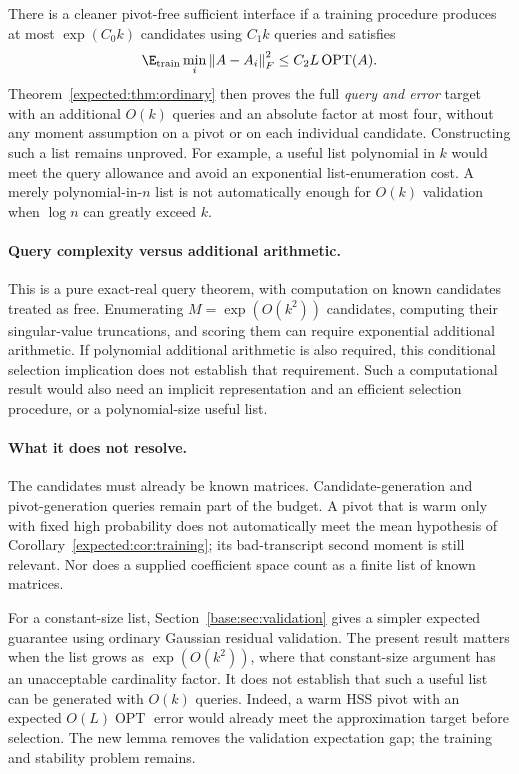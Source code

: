 \documentclass[11pt,oneside,openany,a4paper]{book}
\numberwithin{equation}{chapter}
\theoremstyle{definition}
\theoremstyle{remark}
\newcommand{\F}[1]{\left\lVert#1\right\rVert_F}
\begin{document}
There is a cleaner pivot-free sufficient interface if a training
procedure produces at most $\exp(C_0 k)$ candidates using $C_1k$
queries and satisfies
\[
 \E_{\rm train}\min_i\F{A-A_i}^2
       \le C_2L\operatorname{OPT}(A).
\]
Theorem~\ref{expected:thm:ordinary} then proves the full \emph{query and error}
target with an additional $O(k)$ queries and an absolute factor at
most four, without any moment assumption on a pivot or on each
individual candidate. Constructing such a list remains unproved.
For example, a useful list polynomial in $k$ would meet the query
allowance and avoid an exponential list-enumeration cost. A merely
polynomial-in-$n$ list is not automatically enough for $O(k)$
validation when $\log n$ can greatly exceed $k$.

\paragraph{Query complexity versus additional arithmetic.}
This is a pure exact-real query theorem, with computation on known
candidates treated as free. Enumerating $M=\exp(O(k^2))$ candidates,
computing their singular-value truncations, and scoring them can require
exponential additional arithmetic. If polynomial additional arithmetic
is also required, this conditional selection implication does not
establish that requirement. Such a computational result would also
need an implicit representation and an efficient selection procedure,
or a polynomial-size useful list.

\paragraph{What it does not resolve.}
The candidates must already be known matrices. Candidate-generation
and pivot-generation queries remain part of the budget. A pivot that
is warm only with fixed high probability does not automatically meet
the mean hypothesis of Corollary~\ref{expected:cor:training}; its bad-transcript
second moment is still relevant. Nor does a supplied coefficient space
count as a finite list of known matrices.

For a constant-size list, Section~\ref{base:sec:validation} gives a
simpler expected guarantee using ordinary Gaussian residual validation.
The present result matters when the list grows as $\exp(O(k^2))$,
where that constant-size argument has an unacceptable cardinality
factor. It does not establish that such a useful list can be generated
with $O(k)$ queries. Indeed, a warm HSS pivot with an expected
$O(L)\operatorname{OPT}$ error would already meet the approximation
target before selection. The new lemma removes the validation
expectation gap; the training and stability problem remains.
\end{document}
